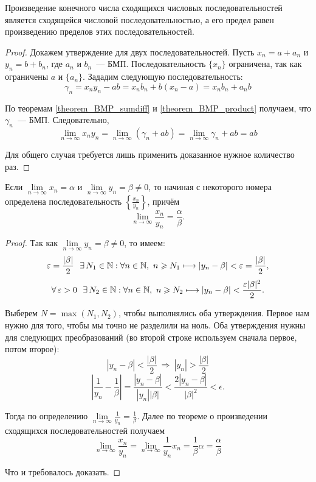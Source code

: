\begin{theorem}
Произведение конечного числа сходящихся числовых последовательностей
является сходящейся числовой последовательностью, а его предел
равен произведению пределов этих последовательностей.

\begin{proof}
Докажем утверждение для двух последовательностей.
Пусть \(x_{n} = a + a_{n}\) и \(y_{n} = b + b_{n}\), где \(a_{n}\) и \(b_{n}\)~--- БМП.
Последовательность \(\{x_{n}\}\) ограничена, так как ограничены \(a\) и \(\{a_{n}\}\).
Зададим следующую последовательность:
\[
\gamma_{n} = x_{n}y_{n} - ab = x_{n}b_{n} + b(x_{n} - a) = x_{n}b_{n} + a_{n}b
\]

По теоремам \ref{theorem_BMP_sumdiff} и \ref{theorem_BMP_product} получаем, 
что \(\gamma_{n}\)~--- БМП. Следовательно,
\[
\lim_{ n \to \infty } x_{n}y_{n} =
\lim_{ n \to \infty } (\gamma_{n} + ab) =
\lim_{ n \to \infty } \gamma_{n} + ab = ab
\]

Для общего случая требуется лишь применить доказанное нужное количество раз.
\end{proof}
\end{theorem}

\begin{theorem}
Если \(\lim\limits_{n \to \infty} x_{n} = \alpha\) и
\(\lim\limits_{n \to \infty} y_{n}= \beta \neq 0\), то начиная
с некоторого номера определена последовательность \(\left\{\frac{x_{n}}{y_{n}}\right\}\), причём
\[
\lim\limits_{n \to \infty} \frac{x_{n}}{y_{n}} = \frac{\alpha}{\beta}.
\]

\begin{proof}
Так как
\(\lim\limits_{n \to \infty} y_{n}= \beta \neq 0\), то имеем:
\[
\varepsilon = \frac{|\beta|}{2} ~~ \exists \, N_{1} \in \mathbb{N}:
\forall n \in \mathbb{N}, ~ n \geqslant N_{1} \longmapsto |y_{n} - \beta| < \varepsilon = \frac{|\beta|}{2},
\]
\[
\forall \, \varepsilon > 0 ~~ \exists \, N_{2} \in \mathbb{N}:
\forall n \in \mathbb{N}, ~ n \geqslant N_{2} \longmapsto |y_{n} - \beta| < \frac{\varepsilon|\beta|^2}{2}.
\]

Выберем \(N = \max(N_{1}, N_{2})\), чтобы выполнялись оба утверждения.
Первое нам нужно для того, чтобы мы точно не разделили на ноль.
Оба утверждения нужны для следующих преобразований
(во второй строке используем сначала первое, потом второе):
\[
|y_{n} - \beta| < \frac{|\beta|}{2} ~ \Rightarrow ~ |y_{n}| > \frac{|\beta|}{2}
\]
\[
\left|\frac{1}{y_{n}} - \frac{1}{\beta}\right|
= \frac{|y_{n} - \beta|}{|y_{n}||\beta|}
< \frac{2|y_{n} - \beta|}{|\beta|^{2}} < \epsilon.
\]

Тогда по определению \(\lim\limits_{n \to \infty} \frac{1}{y_{n}} = \frac{1}{\beta}\).
Далее по теореме о произведении сходящихся последовательностей получаем
\[
\lim\limits_{n \to \infty} \frac{x_{n}}{y_{n}} =
\lim_{n \to \infty} \frac{1}{y_{n}}x_{n} = \frac{1}{\beta}\alpha = \frac{\alpha}{\beta}
\]

Что и требовалось доказать.
\end{proof}
\end{theorem}

